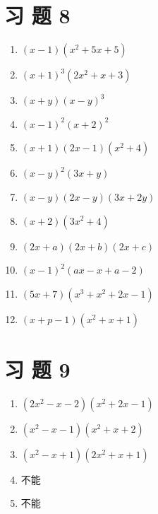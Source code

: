 \documentclass[10pt]{article}
\begin{document}
\section*{习 题 8}
\begin{enumerate}
  \item $(x-1)\left(x^{2}+5 x+5\right)$
  \item $(x+1)^{3}\left(2 x^{2}+x+3\right)$
  \item $(x+y)(x-y)^{3}$
  \item $(x-1)^{2}(x+2)^{2}$
  \item $(x+1)(2 x-1)\left(x^{2}+4\right)$
  \item $(x-y)^{2}(3 x+y)$
  \item $(x-y)(2 x-y)(3 x+2 y)$
  \item $(x+2)\left(3 x^{2}+4\right)$
  \item $(2 x+a)(2 x+b)(2 x+c)$
  \item $(x-1)^{2}(a x-x+a-2)$
  \item $(5 x+7)\left(x^{3}+x^{2}+2 x-1\right)$
  \item $(x+p-1)\left(x^{2}+x+1\right)$
\end{enumerate}

\section*{习 题 9}
\begin{enumerate}
  \item $\left(2 x^{2}-x-2\right)\left(x^{2}+2 x-1\right)$
  \item $\left(x^{2}-x-1\right)\left(x^{2}+x+2\right)$
  \item $\left(x^{2}-x+1\right)\left(2 x^{2}+x+1\right)$
  \item 不能
  \item 不能
\end{enumerate}
\end{document}
